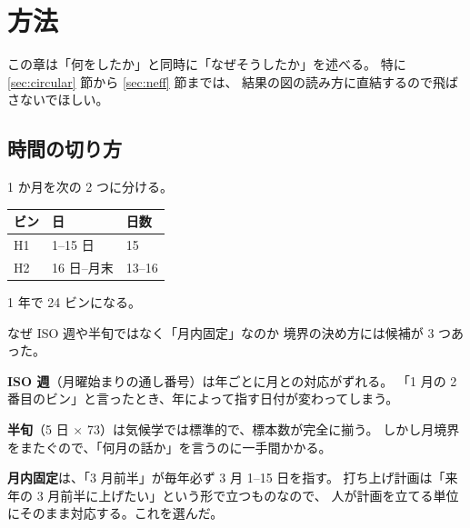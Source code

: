 \section{方法}
\label{sec:method}

この章は「何をしたか」と同時に「なぜそうしたか」を述べる。
特に \ref{sec:circular} 節から \ref{sec:neff} 節までは、
結果の図の読み方に直結するので飛ばさないでほしい。

\subsection{時間の切り方}
\label{sec:weeks}

1 か月を次の 2 つに分ける。

\begin{center}
\begin{tabular}{lll}
\toprule
ビン & 日 & 日数 \\
\midrule
H1 & 1--15 日 & 15 \\
H2 & 16 日--月末 & 13--16 \\
\bottomrule
\end{tabular}
\end{center}

1 年で 24 ビンになる。

\begin{whybox}{なぜ ISO 週や半旬ではなく「月内固定」なのか}
境界の決め方には候補が 3 つあった。

\textbf{ISO 週}（月曜始まりの通し番号）は年ごとに月との対応がずれる。
「1 月の 2 番目のビン」と言ったとき、年によって指す日付が変わってしまう。

\textbf{半旬}（5 日 $\times$ 73）は気候学では標準的で、標本数が完全に揃う。
しかし月境界をまたぐので、「何月の話か」を言うのに一手間かかる。

\textbf{月内固定}は、「3 月前半」が毎年必ず 3 月 1--15 日を指す。
打ち上げ計画は「来年の 3 月前半に上げたい」という形で立つものなので、
人が計画を立てる単位にそのまま対応する。これを選んだ。
\end{whybox}

